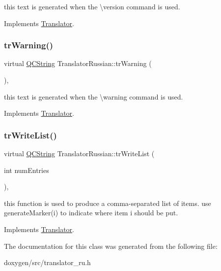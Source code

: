 this text is generated when the \textbackslash{}version command is used. 

Implements \mbox{\hyperlink{class_translator}{Translator}}.

\mbox{\label{class_translator_russian_ae658e3735f56001eaa63e5cb46b63aac}} 
\subsubsection{\texorpdfstring{trWarning()}{trWarning()}}
{\footnotesize\ttfamily virtual \mbox{\hyperlink{class_q_c_string}{Q\+C\+String}} Translator\+Russian\+::tr\+Warning (\begin{DoxyParamCaption}{ }\end{DoxyParamCaption})\hspace{0.3cm}{\ttfamily [inline]}, {\ttfamily [virtual]}}

this text is generated when the \textbackslash{}warning command is used. 

Implements \mbox{\hyperlink{class_translator}{Translator}}.

\mbox{\label{class_translator_russian_a69b61f7eb24d3ad2484956561652cdbc}} 
\subsubsection{\texorpdfstring{trWriteList()}{trWriteList()}}
{\footnotesize\ttfamily virtual \mbox{\hyperlink{class_q_c_string}{Q\+C\+String}} Translator\+Russian\+::tr\+Write\+List (\begin{DoxyParamCaption}\item[{int}]{num\+Entries }\end{DoxyParamCaption})\hspace{0.3cm}{\ttfamily [inline]}, {\ttfamily [virtual]}}

this function is used to produce a comma-\/separated list of items. use generate\+Marker(i) to indicate where item i should be put. 

Implements \mbox{\hyperlink{class_translator}{Translator}}.



The documentation for this class was generated from the following file\+:\begin{DoxyCompactItemize}
\item 
doxygen/src/translator\+\_\+ru.\+h\end{DoxyCompactItemize}
